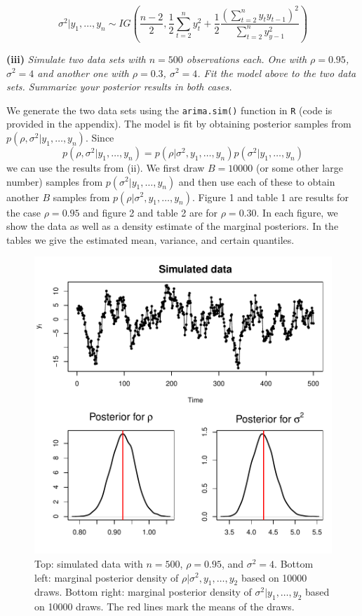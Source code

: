 \documentclass[12pt]{article}
\begin{document}
\[ \sigma^2|y_1,\ldots,y_n \sim IG\left(\frac{n-2}{2}, \frac{1}{2}\sum_{t=2}^ny_t^2 +\frac{1}{2}\frac{(\sum_{t=2}^ny_t y_{t-1})^2}{\sum_{t=2}^ny_{y-1}^2}\right) \]

\bigskip
\noindent \textbf{(iii)} \emph{Simulate two data sets with $n=500$ observations each. One with $\rho=0.95$, $\sigma^2=4$ and another one with $\rho=0.3$, $\sigma^2=4$. Fit the model above to the two data sets. Summarize your posterior results in both cases.}
\bigskip

\noindent We generate the two data sets using the \texttt{arima.sim()} function in \texttt{R} (code is provided in the appendix). The model is fit by obtaining posterior samples from $p(\rho,\sigma^2|y_1,\ldots,y_n)$. Since
\[ p(\rho,\sigma^2|y_1,\ldots,y_n) = p(\rho|\sigma^2,y_1,\ldots,y_n)p(\sigma^2|y_1,\ldots,y_n) \]
we can use the results from (ii). We first draw $B=10000$ (or some other large number) samples from $p(\sigma^2|y_1,\ldots,y_n)$ and then use each of these to obtain another $B$ samples from $p(\rho|\sigma^2,y_1,\ldots,y_n)$. Figure 1 and table 1 are results for the case $\rho=0.95$ and figure 2 and table 2 are for $\rho=0.30$. In each figure, we show the data as well as a density estimate of the marginal posteriors. In the tables we give the estimated mean, variance, and certain quantiles.

\begin{figure}[H]
\begin{center}
\includegraphics[scale=1.00]{figs/fig_1.pdf}
\end{center}
\caption{Top: simulated data with $n=500$, $\rho=0.95$, and $\sigma^2=4$. Bottom left: marginal posterior density of $\rho|\sigma^2,y_1,\ldots,y_2$ based on 10000 draws. Bottom right: marginal posterior density of $\sigma^2|y_1,\ldots,y_2$ based on 10000 draws. The red lines mark the means of the draws.}
\end{figure}
\bigskip
\end{document}
